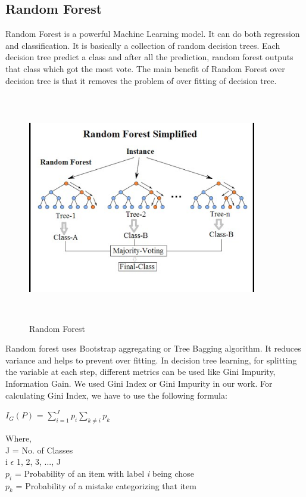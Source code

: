 \documentclass[12pt,a4paper]{article}
\begin{document}
\subsection{Random Forest}
Random Forest is a powerful Machine Learning model. It can do both regression and classification.\cite{liaw2002classification} It is basically a collection of random decision trees. Each decision tree predict a class and after all the prediction, random forest outputs that class which got the most vote. The main benefit of Random Forest over decision tree is that it removes the problem of over fitting of decision tree.\cite{friedman2001elements} 
\begin{figure}[!htb]
  \includegraphics[width=10cm,height=10cm,keepaspectratio]{random_forest.jpg}
  \centering
  \caption{Random Forest}
  \label{fig:random_forest}
\end{figure}
Random forest uses Bootstrap aggregating or Tree Bagging algorithm. It reduces variance and helps to prevent over fitting. In decision tree learning, for splitting the variable at each step, different metrics can be used like Gini Impurity, Information Gain. We used Gini Index or Gini Impurity in our work. For calculating Gini Index, we have to use the following formula: \\
\centerline{$I_{G}(P)$ = $\sum_{i=1}^{J}p_{i}\sum_{k\neq{i}}p_{k}$}
Where,\\
J = No. of Classes\\
i $\epsilon$ {1, 2, 3, ..., J}\\
$p_{i}$ = Probability of an item with label \textit{i} being chose\\
$p_{k}$ = Probability of a mistake categorizing that item \cite{wiki:decisiontreelearning}
 
\end{document}
